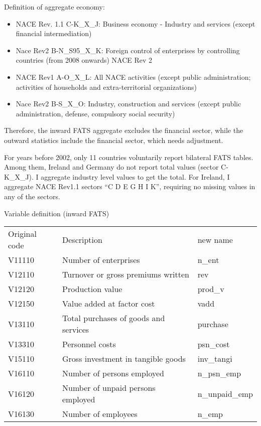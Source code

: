 \documentclass[notitlepage,11pt]{article}%
\begin{document}
Definition of aggregate economy:

\begin{itemize}
\item NACE Rev. 1.1 C-K\_X\_J: Business economy - Industry and services
(except financial intermediation)

\item Nace Rev2 B-N\_S95\_X\_K: Foreign control of enterprises by controlling
countries (from 2008 onwards) NACE Rev 2

\item NACE Rev1 A-O\_X\_L: All NACE activities (except public administration;
activities of households and extra-territorial organizations)

\item Nace Rev2 B-S\_X\_O: Industry, construction and services (except public
administration, defense, compulsory social security)
\end{itemize}

Therefore, the inward FATS aggregate excludes the financial sector, while the
outward statistics include the financial sector, which needs adjustment.

For years before 2002, only 11 countries voluntarily report bilateral FATS
tables. Among them, Ireland and Germany do not report total values (sector
C-K\_X\_J). I aggregate industry level values to get the total. For Ireland, I
aggregate NACE Rev1.1 sectors \textquotedblleft C D E G H I
K\textquotedblright, requiring no missing values in any of the sectors.

Variable definition (inward FATS)%

\begin{tabular}
[c]{lll}%
Original code & Description & new name\\
V11110 & Number of enterprises & n\_ent\\
V12110 & Turnover or gross premiums written & rev\\
V12120 & Production value & prod\_v\\
V12150 & Value added at factor cost & vadd\\
V13110 & Total purchases of goods and services & purchase\\
V13310 & Personnel costs & psn\_cost\\
V15110 & Gross investment in tangible goods & inv\_tangi\\
V16110 & Number of persons employed & n\_psn\_emp\\
V16120 & Number of unpaid persons employed & n\_unpaid\_emp\\
V16130 & Number of employees & n\_emp
\end{tabular}
\end{document}
